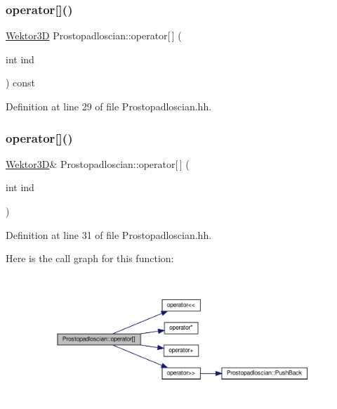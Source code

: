 \subsubsection{\texorpdfstring{operator[]()}{operator[]()}\hspace{0.1cm}{\footnotesize\ttfamily [1/2]}}
{\footnotesize\ttfamily \hyperlink{_wektor3_d_8hh_ac353a272b38b4ad342f7181ad7bdb91a}{Wektor3D} Prostopadloscian\+::operator\mbox{[}$\,$\mbox{]} (\begin{DoxyParamCaption}\item[{int}]{ind }\end{DoxyParamCaption}) const\hspace{0.3cm}{\ttfamily [inline]}}



Definition at line 29 of file Prostopadloscian.\+hh.

\mbox{\label{class_prostopadloscian_a84dc465ece10f2fa7d60e64fc70f29c6}} 
\subsubsection{\texorpdfstring{operator[]()}{operator[]()}\hspace{0.1cm}{\footnotesize\ttfamily [2/2]}}
{\footnotesize\ttfamily \hyperlink{_wektor3_d_8hh_ac353a272b38b4ad342f7181ad7bdb91a}{Wektor3D}\& Prostopadloscian\+::operator\mbox{[}$\,$\mbox{]} (\begin{DoxyParamCaption}\item[{int}]{ind }\end{DoxyParamCaption})\hspace{0.3cm}{\ttfamily [inline]}}



Definition at line 31 of file Prostopadloscian.\+hh.

Here is the call graph for this function\+:
\nopagebreak
\begin{figure}[H]
\begin{center}
\leavevmode
\includegraphics[width=350pt]{class_prostopadloscian_a84dc465ece10f2fa7d60e64fc70f29c6_cgraph}
\end{center}
\end{figure}
\mbox{\label{class_prostopadloscian_a42c4460d389ab1a0b62b6cf3e84abccd}} 
